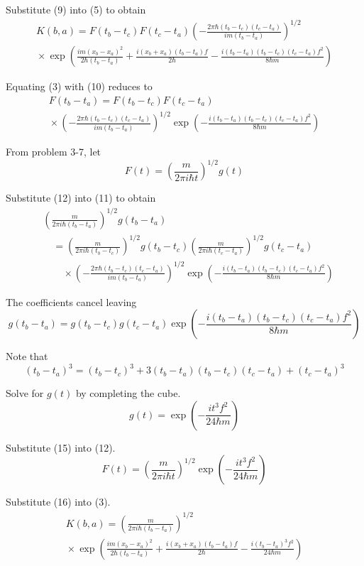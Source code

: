 \documentclass[12pt]{article}
\begin{document}
Substitute (9) into (5) to obtain
{\footnotesize
\begin{multline*}
K(b,a)=F(t_b-t_c)F(t_c-t_a)
\left(-\frac{2\pi\hbar(t_b-t_c)(t_c-t_a)}{im(t_b-t_a)}\right)^{1/2}
\\
{}\times \exp\left(
\frac{im(x_b-x_a)^2}{2\hbar(t_b-t_a)}
+\frac{i(x_b+x_a)(t_b-t_a)f}{2\hbar}
-\frac{i(t_b-t_a)(t_b-t_c)(t_c-t_a)f^2}{8\hbar m}
\right)
\tag{10}
\end{multline*}
}


Equating (3) with (10) reduces to
\begin{multline*}
F(t_b-t_a)=F(t_b-t_c)F(t_c-t_a)
\\
{}\times\left(-\frac{2\pi\hbar(t_b-t_c)(t_c-t_a)}{im(t_b-t_a)}\right)^{1/2}
\exp\left(-\frac{i(t_b-t_a)(t_b-t_c)(t_c-t_a)f^2}{8\hbar m}\right)
\tag{11}
\end{multline*}


From problem 3-7, let
\begin{equation*}
F(t)=\left(\frac{m}{2\pi i\hbar t}\right)^{1/2} g(t)
\tag{12}
\end{equation*}


Substitute (12) into (11) to obtain
\begin{align*}
&\left(\frac{m}{2\pi i\hbar(t_b-t_a)}\right)^{1/2} g(t_b-t_a)
\\
&\quad{}=\left(\frac{m}{2\pi i\hbar(t_b-t_c)}\right)^{1/2} g(t_b-t_c)
\left(\frac{m}{2\pi i\hbar(t_c-t_a)}\right)^{1/2} g(t_c-t_a)
\\
&\quad\quad{}\times\left(-\frac{2\pi\hbar(t_b-t_c)(t_c-t_a)}{im(t_b-t_a)}\right)^{1/2}
\exp\left(-\frac{i(t_b-t_a)(t_b-t_c)(t_c-t_a)f^2}{8\hbar m}\right)
\end{align*}


The coefficients cancel leaving
\begin{equation*}
g(t_b-t_a)=g(t_b-t_c)g(t_c-t_a)\exp\left(-\frac{i(t_b-t_a)(t_b-t_c)(t_c-t_a)f^2}{8\hbar m}\right)
\tag{13}
\end{equation*}


Note that
\begin{equation*}
(t_b-t_a)^3=
(t_b-t_c)^3
+3(t_b-t_a)(t_b-t_c)(t_c-t_a)
+(t_c-t_a)^3
\tag{14}
\end{equation*}


Solve for $g(t)$ by completing the cube.
\begin{equation*}
g(t)=\exp\left(-\frac{it^3f^2}{24\hbar m}\right)
\tag{15}
\end{equation*}


Substitute (15) into (12).
\begin{equation*}
F(t)=\left(\frac{m}{2\pi i\hbar t}\right)^{1/2} \exp\left(-\frac{it^3f^2}{24\hbar m}\right)
\tag{16}
\end{equation*}


Substitute (16) into (3).
\begin{multline*}
K(b,a)=\left(\frac{m}{2\pi i\hbar(t_b-t_a)}\right)^{1/2}
\\
{}\times\exp\left(
\frac{im(x_b-x_a)^2}{2\hbar(t_b-t_a)}
+\frac{i(x_b+x_a)(t_b-t_a)f}{2\hbar}
-\frac{i(t_b-t_a)^3f^2}{24\hbar m}
\right)
\end{multline*}
\end{document}
